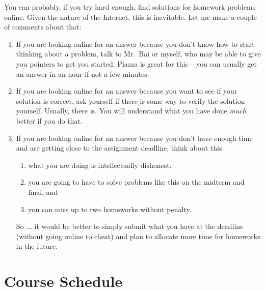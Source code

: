 \documentclass[11pt]{article}
\begin{document}
You can probably, if you try hard enough, find solutions for homework
problems online.    Given the nature of the Internet, this is
inevitable.   Let me make a couple of comments about that:
\begin{enumerate}
\item If you are looking online for an answer because you don't know how
  to start thinking about a problem, talk to Mr.\ Bai or myself, who may be
  able to give you pointers to get you started.  Piazza is great for
  this -- you can usually get an answer in an hour if not a few minutes.
\item If you are looking online for an answer because you want to see if
  your solution is correct, ask yourself if there is some way to verify
  the solution yourself.   Usually, there is.  You will understand what you have done
  \emph{much} better if you do that.
\item If you are looking online for an answer because you don't have
  enough time and are getting close to the assignment deadline, think about this:
  \begin{enumerate}
  \item what you are doing is intellectually dishonest,
  \item you are going to have to solve problems like this on the midterm
    and final, and
  \item you can miss up to two homeworks without penalty.
  \end{enumerate}
So ... it would be better to simply submit what you have at the deadline
(without going online to cheat) and plan to allocate more time for
homeworks in the future.
\end{enumerate}

\newpage
\section*{Course Schedule}
\end{document}
